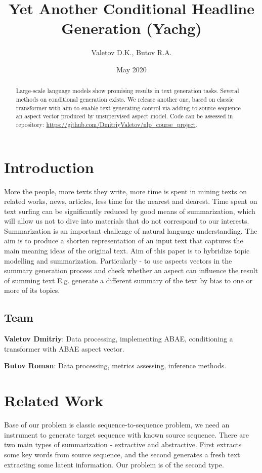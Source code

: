 \documentclass{article}
\title{Yet Another Conditional Headline Generation (Yachg)}
\author{Valetov D.K., Butov R.A.}
\date{May 2020}
\begin{document}
\maketitle
\begin{abstract}
	Large-scale  language  models  show  promising  results in text  generation  tasks. Several methods on conditional generation exists.  We release another one, based on classic transformer with aim to enable text generating control via adding to source sequence an aspect vector produced by unsupervised aspect model.
	Code can be assessed in repository: \url{https://github.com/DmitriyValetov/nlp_course_project}.
\end{abstract}
\section{Introduction}
More the people, more texts they write, more time is spent in mining texts on related works, news, articles, less time for the nearest and dearest. Time spent on text surfing can be significantly reduced by good means of summarization, which will allow us not to dive into materials that do not correspond to our interests. Summarization is an important challenge of natural language understanding. The aim is to produce a  shorten  representation  of  an  input  text  that captures the main meaning ideas of the original text. Aim of this paper is to hybridize topic modelling and summarization. Particularly - to use aspects vectors in the summary generation process and check whether an aspect can influence the result of summing text  E.g. generate a different summary of the text by bias to one or more of its topics.

\subsection{Team}

\textbf{Valetov Dmitriy}: Data processing, implementing ABAE, conditioning a transformer with ABAE aspect vector.

\textbf{Butov Roman}: Data processing, metrics assessing, inference methods.

\section{Related Work}
Base of our problem is classic sequence-to-sequence problem, we need an instrument to generate target sequence with known source sequence. There are two main types of summarization - extractive and abstractive. First extracts some key words from source sequence, and the second generates a fresh text extracting some latent information. Our problem is of the second type. 
\end{document}
